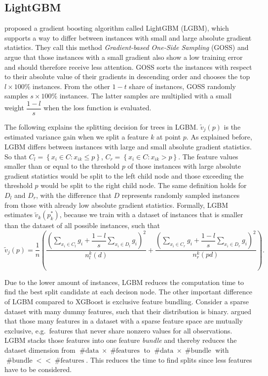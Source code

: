 \documentclass[12pt,a4paper]{article}
\begin{document}
\hypertarget{lightgbm}{%
\subsection{\texorpdfstring{LightGBM \label{sec:lgbm}}{LightGBM }}\label{lightgbm}}

\textcite{Ke2017} proposed a gradient boosting algorithm called LightGBM (LGBM), which supports a way to differ between instances with small and large absolute gradient statistics. They call this method \textit{Gradient-based One-Side Sampling} (GOSS) and argue that those instances with a small gradient also show a low training error and should therefore receive less attention. GOSS sorts the instances with respect to their absolute value of their gradients in descending order and chooses the top \(l \times 100\%\) instances. From the other \(1-t\) share of instances, GOSS randomly samples \(s \times 100\%\) instances. The latter samples are multiplied with a small weight \(\dfrac{1-l}{s}\) when the loss function is evaluated.

The following explains the splitting decision for trees in LGBM. \(\tilde{v}_{j}(p)\) is the estimated variance gain when we split a feature \(k\) at point \(p\). As explained before, LGBM differs between instances with large and small absolute gradient statistics. So that \(C_l = \left\{x_{i} \in C: x_{i k} \leq p\right\}\), \(C_{r}=\left\{x_{i} \in C:x_{ik}>p\right\}\). The feature values smaller than or equal to the threshold \(p\) of those instances with large absolute gradient statistics would be split to the left child node and those exceeding the threshold \(p\) would be split to the right child node. The same definition holds for \(D_l\) and \(D_r\), with the difference that \(D\) represents randomly sampled instances from those with already low absolute gradient statistics. Formally, LGBM estimates \(\tilde{v}_k(p_k^*)\), because we train with a dataset of instances that is smaller than the dataset of all possible instances, such that
\begin{equation}
\tilde{v}_{j}(p)=\frac{1}{n}\left(\frac{\left(\sum_{x_{i} \in C_{l}} g_{i}+\dfrac{1-l}{s} \sum_{x_{i} \in D_{l}} g_{i}\right)^{2}}{n_{l}^{k}(d)}+\frac{\left(\sum_{x_{i} \in C_{r}} g_{i}+\dfrac{1-l}{s} \sum_{x_{i} \in D_{r}} g_{i}\right)^{2}}{n_{r}^{k}(pd)}\right).
\label{eq:lgbm_split}
\end{equation}

Due to the lower amount of instances, LGBM reduces the computation time to find the best split candidate at each decison node.
The other important difference of LGBM compared to XGBoost is exclusive feature bundling. Consider a sparse dataset with many dummy features, such that their distribution is binary. \textcite{Ke2017} argued that those many features in a dataset with a sparse feature space are mutually exclusive, e.g.~features that never share nonzero values for all observations. LGBM stacks those features into one feature \textit{bundle} and thereby reduces the dataset dimension from \(\mathop{\#data} \times \mathop{\#features}\) to \(\mathop{\#data} \times \mathop{\#bundle}\) with \(\mathop{\#bundle}<<\mathop{\#features}\). This reduces the time to find splits since less features have to be considered.
\end{document}
